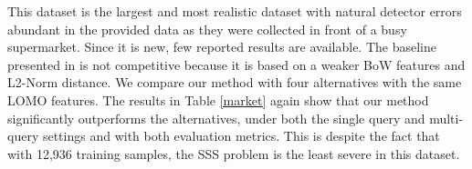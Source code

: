 \documentclass[10pt,twocolumn,letterpaper]{article}
\begin{document}
			\setlength{\tabcolsep}{2.5pt}
			\renewcommand{\arraystretch}{1.2}
	\begin{table}
		\centering
		\caption{Fully supervised results on CUHK03. '-' means that no reported results is available.}
		\label{cuhk03}
		\footnotesize
	\end{table}
	


	


	


	
 \quad This dataset is the largest and most realistic dataset with natural detector errors abundant in the provided data as they were collected in front of a busy supermarket. Since it is new, few reported results are available. The baseline presented in \cite{zheng2015scalable} is not competitive because it is based on a weaker BoW features and L2-Norm distance. We compare our method with four alternatives with the same LOMO features. The results in  Table \ref{market} again show that our method significantly outperforms the alternatives, under both the single query and multi-query settings and with both evaluation metrics.  This is despite the fact that with 12,936 training samples, the SSS problem is the least severe in this dataset.   
\end{document}
